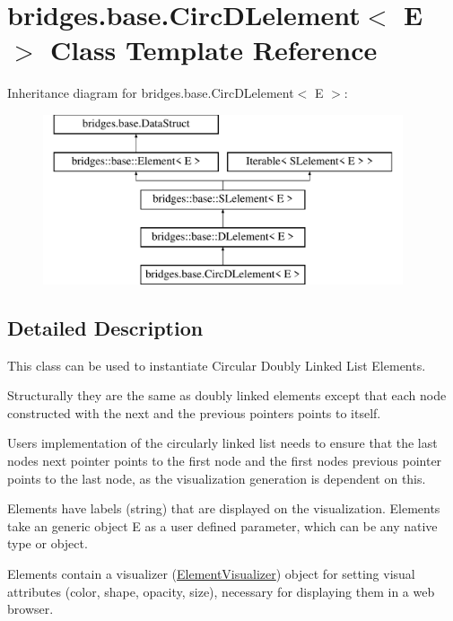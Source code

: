 \hypertarget{classbridges_1_1base_1_1_circ_d_lelement}{}\section{bridges.\+base.\+Circ\+D\+Lelement$<$ E $>$ Class Template Reference}
\label{classbridges_1_1base_1_1_circ_d_lelement}
Inheritance diagram for bridges.\+base.\+Circ\+D\+Lelement$<$ E $>$\+:\begin{figure}[H]
\begin{center}
\leavevmode
\includegraphics[height=5.000000cm]{classbridges_1_1base_1_1_circ_d_lelement}
\end{center}
\end{figure}


\subsection{Detailed Description}
This class can be used to instantiate Circular Doubly Linked List Elements. 

Structurally they are the same as doubly linked elements except that each node constructed with the next and the previous pointers points to itself.

User\textquotesingle{}s implementation of the circularly linked list needs to ensure that the last node\textquotesingle{}s next pointer points to the first node and the first node\textquotesingle{}s previous pointer points to the last node, as the visualization generation is dependent on this.

Elements have labels (string) that are displayed on the visualization. Elements take an generic object E as a user defined parameter, which can be any native type or object.

Elements contain a visualizer (\hyperlink{classbridges_1_1base_1_1_element_visualizer}{Element\+Visualizer}) object for setting visual attributes (color, shape, opacity, size), necessary for displaying them in a web browser.


